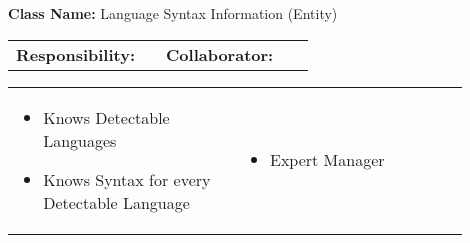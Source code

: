 \begin{cards}[]
    \textbf{Class Name:} Language Syntax Information (Entity)
    \tcbline
    \begin{tabular}{p{0.45\linewidth} | p{0.45\linewidth}}
        \textbf{Responsibility:}& 
        \textbf{Collaborator:}\\
    \end{tabular}
    \tcbline
    \begin{tabular}{p{0.45\linewidth} | p{0.45\linewidth}}
        \begin{itemize}
            \item Knows Detectable Languages
            \item Knows Syntax for every Detectable Language

        \end{itemize}
        &
        \begin{itemize}
            \item Expert Manager
        \end{itemize}
    \end{tabular}
\end{cards}